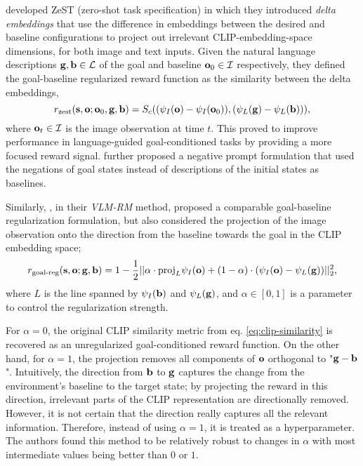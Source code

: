 \cite{zest} developed ZeST (zero-shot task specification) in which they introduced \textit{delta embeddings} that use the difference in embeddings between the desired and baseline configurations to project out irrelevant CLIP-embedding-space dimensions, for both image and text inputs.
Given the natural language descriptions \(\mathbf{g}, \mathbf{b} \in \mathcal{L}\) of the goal and baseline \(\mathbf{o}_0 \in \mathcal{I}\) respectively, they defined the goal-baseline regularized reward function as the similarity between the delta embeddings,
\begin{equation}
    \label{eq:zest}
    r_{\text{zest}}(\mathbf{s}, \mathbf{o}; \mathbf{o}_0, \mathbf{g}, \mathbf{b}) = S_c((\psi_I(\mathbf{o})-\psi_I(\mathbf{o}_0)), (\psi_L(\mathbf{g})-\psi_L(\mathbf{b}))),
\end{equation}
where \(\mathbf{o}_t \in \mathcal{I}\) is the image observation at time \(t\).
This proved to improve performance in language-guided goal-conditioned tasks by providing a more focused reward signal.
\cite{negprompt} further proposed a negative prompt formulation that used the negations of goal states instead of descriptions of the initial states as baselines.

Similarly, \cite{vlmrm}, in their \textit{VLM-RM} method, proposed a comparable goal-baseline regularization formulation, but also considered the projection of the image observation onto the direction from the baseline towards the goal in the CLIP embedding space;
\begin{equation}
    \label{eq:vlmrm}
    r_{\text{goal-reg}}(\mathbf{s}, \mathbf{o}; \mathbf{g}, \mathbf{b}) = 1 - \frac {1}{2}||\alpha\cdot \text{proj}_{L}\psi_I(\mathbf{o}) + (1 - \alpha)\cdot (\psi_I(\mathbf{o}) -\psi_L(\mathbf{g}))||^{2}_{2},
\end{equation}
where \(L\) is the line spanned by \(\psi_I(\mathbf{b})\) and \(\psi_L(\mathbf{g})\), and \(\alpha \in [0, 1]\) is a parameter to control the regularization strength.

For \(\alpha = 0\), the original CLIP similarity metric from eq. \ref{eq:clip-similarity} is recovered as an unregularized goal-conditioned reward function.
On the other hand, for \(\alpha = 1\), the projection removes all components of \(\mathbf{o}\) orthogonal to "\(\mathbf{g} - \mathbf{b}\)".
Intuitively, the direction from \(\mathbf{b}\) to \(\mathbf{g}\) captures the change from the environment's baseline to the target state; by projecting the reward in this direction, irrelevant parts of the CLIP representation are directionally removed.
However, it is not certain that the direction really captures all the relevant information.
Therefore, instead of using \(\alpha = 1\), it is treated as a hyperparameter.
The authors found this method to be relatively robust to changes in \(\alpha\) with most intermediate values being better than \(0\) or \(1\).

